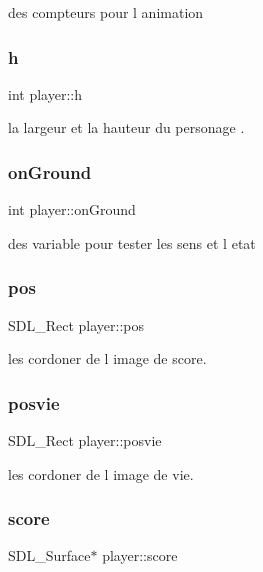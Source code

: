 des compteurs pour l animation \mbox{\label{structplayer_a1441d078ab0d7c6d10ef599dedf6a152}} 
\subsubsection{\texorpdfstring{h}{h}}
{\footnotesize\ttfamily int player\+::h}

la largeur et la hauteur du personage . \mbox{\label{structplayer_acddab25e7c26507904ed5105160af8f7}} 
\subsubsection{\texorpdfstring{on\+Ground}{onGround}}
{\footnotesize\ttfamily int player\+::on\+Ground}

des variable pour tester les sens et l etat \mbox{\label{structplayer_a3ad723e25fd68342601e128927372c8f}} 
\subsubsection{\texorpdfstring{pos}{pos}}
{\footnotesize\ttfamily S\+D\+L\+\_\+\+Rect player\+::pos}

les cordoner de l image de score. \mbox{\label{structplayer_ada95eb1aa625314bda28a04331d55fec}} 
\subsubsection{\texorpdfstring{posvie}{posvie}}
{\footnotesize\ttfamily S\+D\+L\+\_\+\+Rect player\+::posvie}

les cordoner de l image de vie. \mbox{\label{structplayer_a2c9a8f2fce2b0a622f7d8ae2f9985633}} 
\subsubsection{\texorpdfstring{score}{score}}
{\footnotesize\ttfamily S\+D\+L\+\_\+\+Surface$\ast$ player\+::score}

